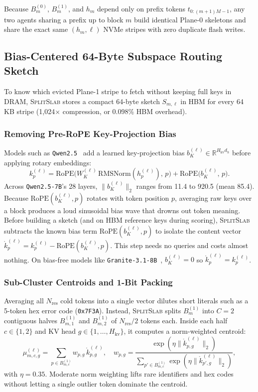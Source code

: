 \documentclass[pdflatex,sn-mathphys-num]{sn-jnl}
\theoremstyle{thmstyleone}
\newcommand{\SplitSlab}{\textsc{SplitSlab}}
\newcommand{\RoPE}{\mathrm{RoPE}}
\begin{document}
Because $B_m^{(0)}$, $B_m^{(1)}$, and $h_m$ depend only on prefix tokens $t_{0:(m+1)M-1}$, any two agents sharing a prefix up to block $m$ build identical Plane-0 skeletons and share the exact same $(h_m, \ell)$ NVMe stripes with zero duplicate flash writes.

\subsection{Bias-Centered 64-Byte Subspace Routing Sketch}\label{subsec:sketch}

To know which evicted Plane-1 stripe to fetch without keeping full keys in DRAM, \SplitSlab{} stores a compact 64-byte sketch $S_{m,\ell}$ in HBM for every 64\,KB stripe (1,024$\times$ compression, or 0.098\% HBM overhead).

\subsubsection{Removing Pre-RoPE Key-Projection Bias}
Models such as \texttt{Qwen2.5}~\cite{yang2024qwen25} add a learned key-projection bias $b_K^{(\ell)} \in \mathbb{R}^{H_{\mathrm{kv}} d_h}$ before applying rotary embeddings:
\begin{equation}\label{eq:rope_bias}
k_p^{(\ell)} = \RoPE\!\big(W_K^{(\ell)}\,\mathrm{RMSNorm}(h_p^{(\ell)}),\, p\big) + \RoPE\!\big(b_K^{(\ell)},\, p\big).
\end{equation}
Across \texttt{Qwen2.5-7B}'s 28 layers, $\|b_K^{(\ell)}\|_2$ ranges from 11.4 to 920.5 (mean 85.4). Because $\RoPE(b_K^{(\ell)}, p)$ rotates with token position $p$, averaging raw keys over a block produces a loud sinusoidal bias wave that drowns out token meaning. Before building a sketch (and on HBM reference keys during scoring), \SplitSlab{} subtracts the known bias term $\RoPE(b_K^{(\ell)}, p)$ to isolate the content vector $\mathring{k}_p^{(\ell)} = k_p^{(\ell)} - \RoPE(b_K^{(\ell)}, p)$. This step needs no queries and costs almost nothing. On bias-free models like \texttt{Granite-3.1-8B}~\cite{mishra2024granite}, $b_K^{(\ell)} = 0$ so $\mathring{k}_p^{(\ell)} = k_p^{(\ell)}$.

\subsubsection{Sub-Cluster Centroids and 1-Bit Packing}
Averaging all $N_{\mathrm{res}}$ cold tokens into a single vector dilutes short literals such as a 5-token hex error code (\texttt{0x7F3A}). Instead, \SplitSlab{} splits $B_m^{(1)}$ into $C = 2$ contiguous halves $B_{m,1}^{(1)}$ and $B_{m,2}^{(1)}$ of $N_{\mathrm{res}}/2$ tokens each. Inside each half $c \in \{1, 2\}$ and KV head $g \in \{1, \dots, H_{\mathrm{kv}}\}$, it computes a norm-weighted centroid:
\begin{equation}\label{eq:salience_centroid}
\mu_{m,c,g}^{(\ell)} = \sum_{p \in B_{m,c}^{(1)}} w_{p,g}\,\mathring{k}_{p,g}^{(\ell)}, \quad
w_{p,g} = \frac{\exp(\eta\|\mathring{k}_{p,g}^{(\ell)}\|_2)}{\sum_{p' \in B_{m,c}^{(1)}} \exp(\eta\|\mathring{k}_{p',g}^{(\ell)}\|_2)},
\end{equation}
with $\eta = 0.35$. Moderate norm weighting lifts rare identifiers and hex codes without letting a single outlier token dominate the centroid.
\end{document}

